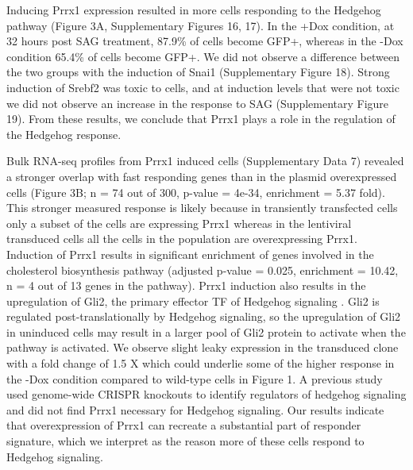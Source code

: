 Inducing Prrx1 expression resulted in more cells responding to the Hedgehog pathway (Figure 3A, Supplementary Figures 16, 17). In the +Dox condition, at 32 hours post SAG treatment, 87.9\% of cells become GFP+, whereas in the -Dox condition 65.4\% of cells become GFP+. We did not observe a difference between the two groups with the induction of Snai1 (Supplementary Figure 18). Strong induction of Srebf2 was toxic to cells, and at induction levels that were not toxic we did not observe an increase in the response to SAG  (Supplementary Figure 19). From these results, we conclude that Prrx1 plays a role in the regulation of the Hedgehog response.

Bulk RNA-seq profiles from Prrx1 induced cells (Supplementary Data 7) revealed a stronger overlap with fast responding genes than in the plasmid overexpressed cells (Figure 3B; n = 74 out of 300, p-value = 4e-34, enrichment = 5.37 fold). This stronger measured response is likely because in transiently transfected cells only a subset of the cells are expressing Prrx1 whereas in the lentiviral transduced cells all the cells in the population are overexpressing Prrx1. Induction of Prrx1 results in significant enrichment of genes involved in the cholesterol biosynthesis pathway (adjusted p-value = 0.025, enrichment = 10.42, n = 4 out of 13 genes in the pathway). Prrx1 induction also results in the upregulation of Gli2, the primary effector TF of Hedgehog signaling \cite{Kong2019-wo,Briscoe2013-ze,Lee2016-bf}. Gli2 is regulated post-translationally by Hedgehog signaling, so the upregulation of Gli2 in uninduced cells may result in a larger pool of Gli2 protein to activate when the pathway is activated. We observe slight leaky expression in the transduced clone with a fold change of 1.5 X which could underlie some of the higher response in the -Dox condition compared to wild-type cells in Figure 1. A previous study used genome-wide CRISPR knockouts \cite{Pusapati2018-gs} to identify regulators of hedgehog signaling and did not find Prrx1 necessary for Hedgehog signaling. Our results indicate that overexpression of Prrx1 can recreate a substantial part of responder signature, which we interpret as the reason more of these cells respond to Hedgehog signaling.

